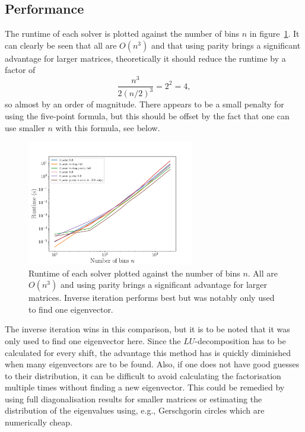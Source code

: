 \documentclass[a4paper,DIV=12,english]{scrartcl}
\begin{document}
\subsection{Performance}
The runtime of each solver is plotted against the number of bins $n$ in figure~\ref{fig:performance}. It can clearly be seen that all are $O(n^3)$ and that using parity brings a significant advantage for larger matrices, theoretically it should reduce the runtime by a factor of
\begin{equation}
    \frac{n^3}{2(n/2)^3} = 2^2 = 4,
\end{equation}
so almost by an order of magnitude. There appears to be a small penalty for using the five-point formula, but this should be offset by the fact that one can use smaller $n$ with this formula, see below.
\begin{figure}
    \centering
    \includegraphics[width=0.65\textwidth]{../plots/bench/bench.pdf}
    \caption{Runtime of each solver plotted against the number of bins $n$. All are $O(n^3)$ and using parity brings a significant advantage for larger matrices. Inverse iteration performs best but was notably only used to find one eigenvector.}
    \label{fig:performance}
\end{figure}

The inverse iteration wins in this comparison, but it is to be noted that it was only used to find one eigenvector here. Since the $LU$-decomposition has to be calculated for every shift, the advantage this method has is quickly diminished when many eigenvectors are to be found. Also, if one does not have good guesses to their distribution, it can be difficult to avoid calculating the factorisation multiple times without finding a new eigenvector. This could be remedied by using full diagonalisation results for smaller matrices or estimating the distribution of the eigenvalues using, e.g., Gerschgorin circles which are numerically cheap.
\end{document}
